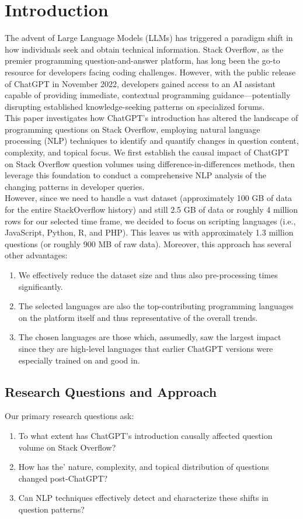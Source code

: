 \section{Introduction}
The advent of Large Language Models (LLMs) has triggered a paradigm shift in how individuals seek and obtain technical information. Stack Overflow, as the premier programming question-and-answer platform, has long been the go-to resource for developers facing coding challenges. However, with the public release of ChatGPT in November 2022, developers gained access to an AI assistant capable of providing immediate, contextual programming guidance—potentially disrupting established knowledge-seeking patterns on specialized forums.\\

This paper investigates how ChatGPT's introduction has altered the landscape of programming questions on Stack Overflow, employing natural language processing (NLP) techniques to identify and quantify changes in question content, complexity, and topical focus. We first establish the causal impact of ChatGPT on Stack Overflow question volumes using difference-in-differences methods, then leverage this foundation to conduct a comprehensive NLP analysis of the changing patterns in developer queries.\\

However, since we need to handle a vast dataset (approximately 100 GB of data for the entire StackOverflow history) and still 2.5 GB of data or roughly 4 million rows for our selected time frame, we decided to focus on scripting languages (i.e., JavaScript, Python, R, and PHP). This leaves us with approximately 1.3 million questions (or roughly 900 MB of raw data). Moreover, this approach has several other advantages:
\begin{enumerate}
    \item We effectively reduce the dataset size and thus also pre-processing times significantly.
    \item The selected languages are also the top-contributing programming languages on the platform itself and thus representative of the overall trends.
    \item The chosen languages are those which, assumedly, saw the largest impact since they are high-level languages that earlier ChatGPT versions were especially trained on and good in. 
\end{enumerate}

\subsection{Research Questions and Approach}
Our primary research questions ask: 
\begin{enumerate}
    \item To what extent has ChatGPT's introduction causally affected question volume on Stack Overflow?
    \item How has the' nature, complexity, and topical distribution of questions changed post-ChatGPT?
    \item Can NLP techniques effectively detect and characterize these shifts in question patterns?
\end{enumerate}

